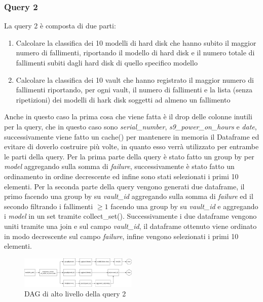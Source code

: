 \documentclass[conference]{IEEEtran}
\begin{document}
\subsubsection{Query 2}
La query 2 è composta di due parti:
\begin{enumerate}
    \item Calcolare la classifica dei 10 modelli di hard disk che hanno subito il maggior numero di fallimenti, riportando il modello di hard disk e il numero totale di fallimenti subiti dagli hard disk di quello specifico modello
    \item Calcolare la classifica dei 10 vault che hanno registrato il maggior numero di
    fallimenti riportando, per ogni vault, il numero di fallimenti e la lista (senza ripetizioni) dei modelli di
    hark disk soggetti ad almeno un fallimento
\end{enumerate}
Anche in questo caso la prima cosa che viene fatta è il drop delle colonne inutili per la query, che in questo caso sono \textit{serial\_number}, \textit{s9\_power\_on\_hours} e \textit{date}, successivamente viene fatto un cache() per mantenere in memoria il Dataframe ed evitare di doverlo costruire più volte, in quanto esso verrà utilizzato per entrambe le parti della query.
Per la prima parte della query è stato fatto un group by per \textit{model} aggregando sulla somma di \textit{failure}, successivamente è stato fatto un ordinamento in ordine decrescente ed infine sono stati selezionati i primi 10 elementi.
Per la seconda parte della query vengono generati due dataframe, il primo facendo una group by su \textit{vault\_id} aggregando sulla somma di \textit{failure} ed il secondo filtrando i fallimenti $\geq1$ facendo una group by su \textit{vault\_id} e aggregando i \textit{model} in un set tramite collect\_set(). Successivamente i due dataframe vengono uniti tramite una join e sul campo \textit{vault\_id}, il dataframe ottenuto viene ordinato in modo decrescente sul campo \textit{failure}, infine vengono selezionati i primi 10 elementi.
\begin{figure}[H]
    \centerline{\includegraphics[width=0.5\textwidth]{res/query2_dag.png}}
    \caption{DAG di alto livello della query 2}
    \label{fig:dag_query2}
\end{figure}
\end{document}
